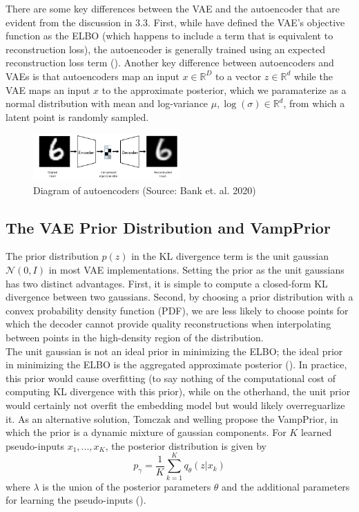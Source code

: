 \documentclass[./dissertation.tex]{subfiles}
\begin{document}
    There are some key differences between the VAE and the autoencoder that are evident from the discussion in 3.3. First, while have defined the VAE's objective function as the ELBO (which happens to include a term that is equivalent to reconstruction loss), the autoencoder is generally trained using an expected reconstruction loss term (\cite{bank2020autoencoders}). Another key difference between autoencoders and VAEs is that autoencoders map an input $x \in \mathbb{R}^{D}$ to a vector $z \in \mathbb{R}^{d}$ while the VAE maps an input $x$ to the approximate posterior, which we paramaterize as a normal distribution with mean and log-variance $\mu, \log(\sigma) \in \mathbb{R}^{d}$, from which a latent point is randomly sampled. 
    
    \begin{figure}[h]
        \centering\includegraphics[width=0.5\textwidth]{figures/autoencoder.PNG}
        \caption{Diagram of autoencoders (Source: Bank et. al. 2020)}
        \label{Autoencoder Diagram}
    \end{figure}
    
    \subsection{The VAE Prior Distribution and VampPrior}
    The prior distribution $p(z)$ in the KL divergence term is the unit gaussian $\mathcal{N}(0, I)$ in most VAE implementations. Setting the prior as the unit gaussians has two distinct advantages. First, it is simple to compute a closed-form KL divergence between two gaussians. Second, by choosing a prior distribution with a convex probability density function (PDF), we are less likely to choose points for which the decoder cannot provide quality reconstructions when interpolating between points in the high-density region of the distribution. \\
    
    The unit gaussian is not an ideal prior in minimizing the ELBO; the ideal prior in minimizing the ELBO is the aggregated approximate posterior (\cite{tomczak2018vae}). In practice, this prior would cause overfitting (to say nothing of the computational cost of computing KL divergence with this prior), while on the otherhand, the unit prior would certainly not overfit the embedding model but would likely overreguarlize it. As an alternative solution, Tomczak and welling propose the VampPrior, in which the prior is a dynamic mixture of gaussian components. For $K$ learned pseudo-inputs $x_{1},...,x_{K}$, the posterior distribution is given by
    \begin{equation*}
        p_{\gamma}=\frac{1}{K}
        \sum_{k=1}^{K}
        q_{\theta}(z|x_{k})
    \end{equation*}
    where $\lambda$ is the union of the posterior parameters $\theta$ and the additional parameters for learning the pseudo-inputs (\cite{tomczak2018vae}).

    
\end{document}
